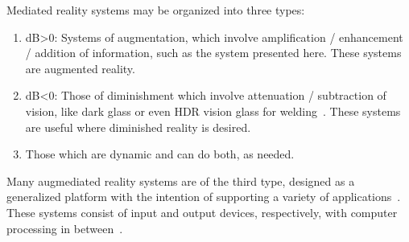 \documentclass{sigchi-ext}
\begin{document}
Mediated reality systems may be organized into three types:
\begin{enumerate}
\vspace{-.15in}
 \item dB\textgreater  0: Systems of augmentation, which involve amplification / enhancement / addition of information, such as the system presented here. These systems are augmented reality.
 \item dB\textless  0: Those of diminishment which involve
attenuation / subtraction of vision, like dark glass or even
HDR vision glass for welding~\cite{mannHDR}.
These systems are useful where diminished reality is desired.
 \item Those which are dynamic and can do both, as needed.
\end{enumerate}
Many augmediated reality systems are of the third type, designed as a
generalized platform with the intention of supporting a variety of
applications~\cite{arsurvey}. These
systems consist of input and output devices,
respectively, with computer processing in
between~\cite{mann2012realtime, mann1998wearable, mann1998humanistic,
mann2001wearable}.

\end{document}
